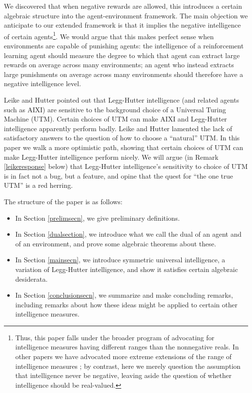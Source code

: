\documentclass{article}
\begin{document}
We discovered that when negative rewards are allowed, this
introduces a certain algebraic structure into the agent-environment framework. The
main objection we anticipate to our extended framework
is that it implies the negative intelligence of certain
agents\footnote{Thus, this paper falls under the broader
program of advocating for intelligence measures having different ranges than
the nonnegative reals. In other papers we have advocated
more extreme extensions of the range of intelligence measures
\cite{alexander2020archimedean}; by contrast, here we merely question the
assumption that intelligence never be negative, leaving aside the
question of whether intelligence should be real-valued.}.
We would argue that this makes perfect sense when environments are capable of punishing
agents: the intelligence of a reinforcement learning agent should measure the
degree to which that agent can extract large rewards on average across many environments;
an agent who instead extracts large punishments on average across many environments
should therefore have a negative intelligence level.

Leike and Hutter \cite{leike2015bad} pointed out that Legg-Hutter intelligence
(and related agents such as AIXI) are sensitive to the background choice of a Universal
Turing Machine (UTM). Certain choices of UTM can make AIXI and Legg-Hutter intelligence
apparently perform badly. Leike and Hutter lamented the lack of satisfactory answers to
the question of how to choose a ``natural'' UTM. In this paper we walk a more optimistic
path, showing that certain choices of UTM can make Legg-Hutter intelligence perform
nicely. We will argue (in Remark \ref{leikeresponse} below)
that Legg-Hutter intelligence's sensitivity to choice of UTM is
in fact not a bug, but a feature, and opine that the quest for ``the one true UTM'' is
a red herring.

The structure of the paper is as follows:
\begin{itemize}
    \item In Section \ref{prelimsecn}, we give preliminary definitions.
    \item In Section \ref{dualsection}, we introduce what we call the dual of an agent and of
        an environment, and prove some algebraic theorems about these.
    \item In Section \ref{mainsecn}, we introduce symmetric universal intelligence, a variation
        of Legg-Hutter intelligence, and show it satisfies certain algebraic desiderata.
    \item In Section \ref{conclusionsecn}, we summarize and make concluding remarks, including
        remarks about how these ideas might be applied to certain other intelligence measures.
\end{itemize}
\end{document}
